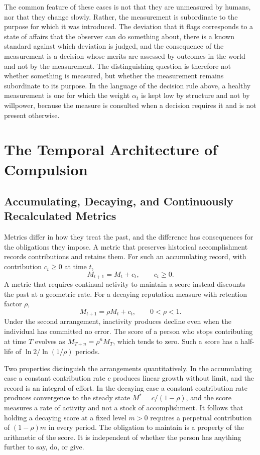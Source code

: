 \documentclass[11pt]{report}
\theoremstyle{definition}
\theoremstyle{remark}
\begin{document}
The common feature of these cases is not that they are unmeasured by humans, nor that they change slowly. Rather, the measurement is subordinate to the purpose for which it was introduced. The deviation that it flags corresponds to a state of affairs that the observer can do something about, there is a known standard against which deviation is judged, and the consequence of the measurement is a decision whose merits are assessed by outcomes in the world and not by the measurement. The distinguishing question is therefore not whether something is measured, but whether the measurement remains subordinate to its purpose. In the language of the decision rule above, a healthy measurement is one for which the weight $\alpha_t$ is kept low by structure and not by willpower, because the measure is consulted when a decision requires it and is not present otherwise.

\chapter{The Temporal Architecture of Compulsion}

\section{Accumulating, Decaying, and Continuously Recalculated Metrics}

Metrics differ in how they treat the past, and the difference has consequences for the obligations they impose. A metric that preserves historical accomplishment records contributions and retains them. For such an accumulating record, with contribution $c_t\ge0$ at time $t$,
\[
M_{t+1}=M_t+c_t,\qquad c_t\ge0.
\]
A metric that requires continual activity to maintain a score instead discounts the past at a geometric rate. For a decaying reputation measure with retention factor $\rho$,
\[
M_{t+1}=\rho M_t+c_t,\qquad 0<\rho<1 .
\]
Under the second arrangement, inactivity produces decline even when the individual has committed no error. The score of a person who stops contributing at time $T$ evolves as $M_{T+n}=\rho^nM_T$, which tends to zero. Such a score has a half-life of $\ln 2/\ln(1/\rho)$ periods.

Two properties distinguish the arrangements quantitatively. In the accumulating case a constant contribution rate $c$ produces linear growth without limit, and the record is an integral of effort. In the decaying case a constant contribution rate produces convergence to the steady state $M^\ast=c/(1-\rho)$, and the score measures a rate of activity and not a stock of accomplishment. It follows that holding a decaying score at a fixed level $m>0$ requires a perpetual contribution of $(1-\rho)m$ in every period. The obligation to maintain is a property of the arithmetic of the score. It is independent of whether the person has anything further to say, do, or give.
\end{document}
